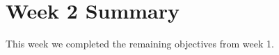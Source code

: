 \documentclass{article}
\begin{document}
\section*{Week 2 Summary}

\vspace{0.5cm}

This week we completed the remaining objectives from week 1.
\end{document}
